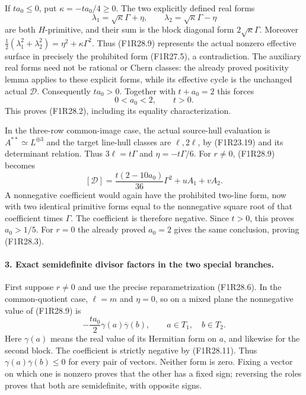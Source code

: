 If $t a_0\le0$, put $\kappa=-t a_0/4\ge0$.
The two explicitly defined real forms
\[
          \lambda_1=\sqrt{\kappa}\Gamma+\eta,
             \qquad
          \lambda_2=\sqrt{\kappa}\Gamma-\eta
 \tag{F1R28.10}
\]
are both $H$-primitive, and their sum is
the block diagonal form $2\sqrt{\kappa}\Gamma$.
Moreover
$\tfrac12(\lambda_1^2+\lambda_2^2)
  =\eta^2+\kappa\Gamma^2$.
Thus (F1R28.9) represents the actual nonzero
effective surface in precisely the prohibited
form (F1R27.5), a contradiction.
The auxiliary real forms need not be
rational or Chern classes: the already
proved positivity lemma applies to these
explicit forms, while its effective cycle
is the unchanged actual $\mathcal D$.
Consequently $t a_0>0$. Together with
$t+a_0=2$ this forces
\[
                             0<a_0<2,\qquad t>0.
 \tag{F1R28.11}
\]
This proves (F1R28.2), including its equality
characterization.

In the three-row common-image case, the
actual source-hull evaluation is
$A^{**}\simeq L^{\oplus3}$ and the target
line-hull classes are $\ell,2\ell$, by
(F1R23.19) and its determinant relation.
Thus $3\ell=t\Gamma$ and
$\eta=-t\Gamma/6$.
For $r\ne0$, (F1R28.9) becomes
\[
       [\mathcal D]=
            \frac{t(2-10a_0)}{36}\Gamma^2
                          +uA_1+vA_2 .
 \tag{F1R28.12}
\]
A nonnegative coefficient would again have
the prohibited two-line form, now with
two identical primitive forms equal to
the nonnegative square root of that
coefficient times $\Gamma$.
The coefficient is therefore negative.
Since $t>0$, this proves $a_0>1/5$.
For $r=0$ the already proved $a_0=2$
gives the same conclusion, proving (F1R28.3).

\paragraph{3. Exact semidefinite divisor factors in the two special branches.}
First suppose $r\ne0$ and use the precise
reparametrization (F1R28.6).
In the common-quotient case, $\ell=m$ and
$\eta=0$, so on a mixed plane the
nonnegative value of (F1R28.9) is
\[
                  -\frac{t a_0}{2}
                    \gamma(a)\overline\gamma(b),
        \qquad a\in T_1,\quad b\in T_2 .
 \tag{F1R28.13}
\]
Here $\gamma(a)$ means the real value of
its Hermitian form on $a$, and likewise
for the second block.
The coefficient is strictly negative
by (F1R28.11).
Thus
$\gamma(a)\overline\gamma(b)\le0$
for every pair of vectors.
Neither form is zero. Fixing a vector
on which one is nonzero proves that
the other has a fixed sign; reversing
the roles proves that both are
semidefinite, with opposite signs.

